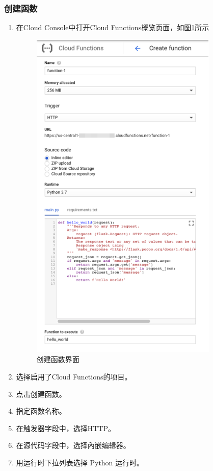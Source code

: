 \documentclass[11pt]{article}
\begin{document}
\subsubsection{创建函数} 
\begin{enumerate}
	\item 在Cloud Console中打开Cloud Functions概览页面，如图\ref{fig15}所示
	\begin{figure}[h]	
		\centering
		\includegraphics[scale=0.6]{figs/15.png}        %
		\caption{创建函数界面}
		\label{fig15}	
	\end{figure}
	\item 选择启用了Cloud Functions的项目。
	\item 点击创建函数。
	\item 指定函数名称。
	\item 在触发器字段中，选择HTTP。
	\item 在源代码字段中，选择內嵌编辑器。
	\item 用运行时下拉列表选择 Python 运行时。
\end{enumerate}	
\end{document}
